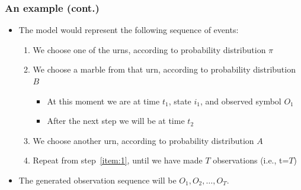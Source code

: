 \documentclass{beamer}
\begin{document}
\begin{frame} \frametitle{An example (cont.)}

  \begin{itemize}[<+->]
  \item The model would represent the following sequence of events:
    \begin{enumerate}
    \item We choose one of the urns, according to probability distribution
      $\pi$
    \item We choose a marble from that urn, according to probability
      distribution $B$
      \label{item:1}
      \begin{itemize}
      \item At this moment we are at time $t_1$, state $i_1$, and observed
        symbol $O_1$
      \item After the next step we will be at time $t_2$
      \end{itemize}
    \item We choose another urn, according to probability distribution $A$
    \item Repeat from step~\ref{item:1}, until we have made $T$ observations
      (i.e., t=$T$)
    \end{enumerate}
  \item The generated observation sequence will be $O_1, O_2, \dotsc, O_T$.
  \end{itemize}

\end{frame}

\end{document}
